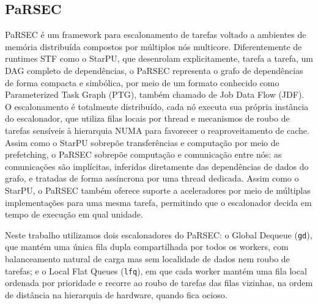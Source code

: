 \documentclass[12pt]{article}
\begin{document}
\subsection{PaRSEC}
\label{sec:org1651fae}
PaRSEC \cite{bosilca2011dague} é um framework para escalonamento de tarefas
voltado a ambientes de memória distribuída compostos por múltiplos nós
multicore. Diferentemente de runtimes STF como o StarPU, que desenrolam
explicitamente, tarefa a tarefa, um DAG completo de dependências, o PaRSEC
representa o grafo de dependências de forma compacta e simbólica, por meio de um
formato conhecido como Parameterized Task Graph (PTG), também chamado de Job
Data Flow (JDF). O escalonamento é totalmente distribuído, cada nó executa sua
própria instância do escalonador, que utiliza filas locais por thread e
mecanismos de roubo de tarefas sensíveis à hierarquia NUMA para favorecer o
reaproveitamento de cache. Assim como o StarPU sobrepõe transferências e
computação por meio de prefetching, o PaRSEC sobrepõe computação e comunicação
entre nós: as comunicações são implícitas, inferidas diretamente das
dependências de dados do grafo, e tratadas de forma assíncrona por uma thread
dedicada. Assim como o StarPU, o PaRSEC também oferece suporte a aceleradores
por meio de múltiplas implementações para uma mesma tarefa, permitindo que o
escalonador decida em tempo de execução em qual unidade.

Neste trabalho utilizamos dois escalonadores do PaRSEC: o Global Dequeue (\texttt{gd}),
que mantém uma única fila dupla compartilhada por todos os workers, com
balanceamento natural de carga mas sem localidade de dados nem roubo de tarefas;
e o Local Flat Queues (\texttt{lfq}), em que cada worker mantém uma fila local
ordenada por prioridade e recorre ao roubo de tarefas das filas vizinhas, na
ordem de distância na hierarquia de hardware, quando fica ocioso.
\end{document}
